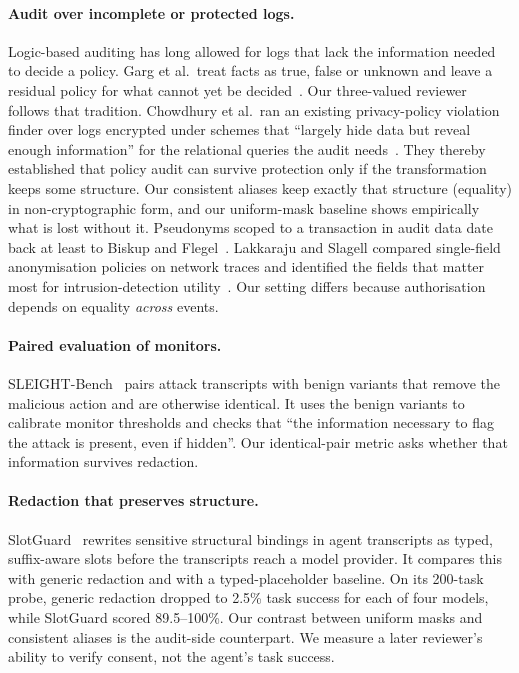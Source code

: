 \documentclass[11pt]{article}
\begin{document}
\paragraph{Audit over incomplete or protected logs.}
Logic-based auditing has long allowed for logs that lack the information needed to decide a policy. Garg et al.\ treat facts as true, false or unknown and leave a residual policy for what cannot yet be decided~\cite{garg2011incomplete}. Our three-valued reviewer follows that tradition. Chowdhury et al.\ ran an existing privacy-policy violation finder over logs encrypted under schemes that ``largely hide data but reveal enough information'' for the relational queries the audit needs~\cite{chowdhury2015equivalence}. They thereby established that policy audit can survive protection only if the transformation keeps some structure. Our consistent aliases keep exactly that structure (equality) in non-cryptographic form, and our uniform-mask baseline shows empirically what is lost without it. Pseudonyms scoped to a transaction in audit data date back at least to Biskup and Flegel~\cite{biskup2000transaction}. Lakkaraju and Slagell compared single-field anonymisation policies on network traces and identified the fields that matter most for intrusion-detection utility~\cite{lakkaraju2008utility}. Our setting differs because authorisation depends on equality \emph{across} events.

\paragraph{Paired evaluation of monitors.}
SLEIGHT-Bench~\cite{najt2026sleight,najt2026sleightarxiv} pairs attack transcripts with benign variants that remove the malicious action and are otherwise identical. It uses the benign variants to calibrate monitor thresholds and checks that ``the information necessary to flag the attack is present, even if hidden''. Our identical-pair metric asks whether that information survives redaction.

\paragraph{Redaction that preserves structure.}
SlotGuard~\cite{xia2026slotguard} rewrites sensitive structural bindings in agent transcripts as typed, suffix-aware slots before the transcripts reach a model provider. It compares this with generic redaction and with a typed-placeholder baseline. On its 200-task probe, generic redaction dropped to 2.5\% task success for each of four models, while SlotGuard scored 89.5--100\%. Our contrast between uniform masks and consistent aliases is the audit-side counterpart. We measure a later reviewer's ability to verify consent, not the agent's task success.
\end{document}

